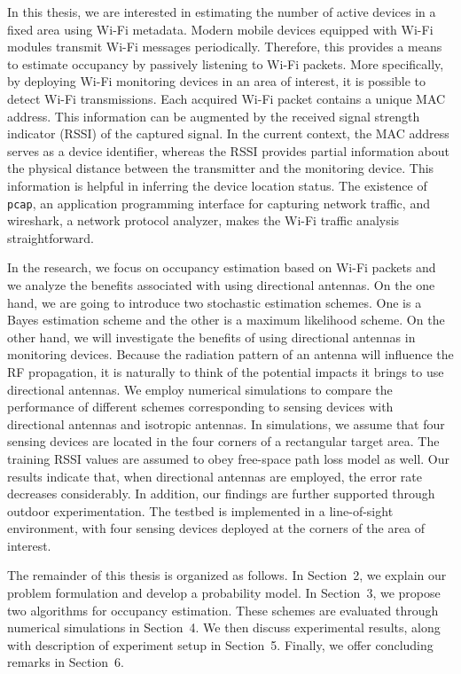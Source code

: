 In this thesis, we are interested in estimating the number of active devices in a fixed area using Wi-Fi metadata.
Modern mobile devices equipped with Wi-Fi modules transmit Wi-Fi messages periodically.
Therefore, this provides a means to estimate occupancy by passively listening to Wi-Fi packets.
More specifically, by deploying Wi-Fi monitoring devices in an area of interest, it is possible to detect Wi-Fi transmissions.
Each acquired Wi-Fi packet contains a unique MAC address.
This information can be augmented by the received signal strength indicator (RSSI) of the captured signal.
In the current context, the MAC address serves as a device identifier, whereas the RSSI provides partial information about the physical distance between the transmitter and the monitoring device.
This information is helpful in inferring the device location status.
The existence of \texttt{pcap}, an application programming interface for capturing network traffic, and wireshark, a network protocol analyzer, makes the Wi-Fi traffic analysis straightforward. 

In the research, we focus on occupancy estimation based on Wi-Fi packets and we analyze the benefits associated with using directional antennas.
On the one hand, we are going to introduce two stochastic estimation schemes.
One is a Bayes estimation scheme and the other is a maximum likelihood scheme.
On the other hand, we will investigate the benefits of using directional antennas in monitoring devices.
Because the radiation pattern of an antenna will influence the RF propagation, it is naturally to think of the potential impacts it brings to use directional antennas. 
We employ numerical simulations to compare the performance of different schemes corresponding to sensing devices with directional antennas and isotropic antennas.
In simulations, we assume that four sensing devices are located in the four corners of a rectangular target area.
The training RSSI values are assumed to obey free-space path loss model as well.
Our results indicate that, when directional antennas are employed, the error rate decreases considerably.
In addition, our findings are further supported through outdoor experimentation.
The testbed is implemented in a line-of-sight environment, with four sensing devices deployed at the corners of the area of interest.

The remainder of this thesis is organized as follows.
In Section~2, we explain our problem formulation and develop a probability model.
In Section~3, we propose two algorithms for occupancy estimation.
These schemes are evaluated through numerical simulations in Section~4.
We then discuss experimental results, along with description of experiment setup in Section~5.
Finally, we offer concluding remarks in Section~6.


